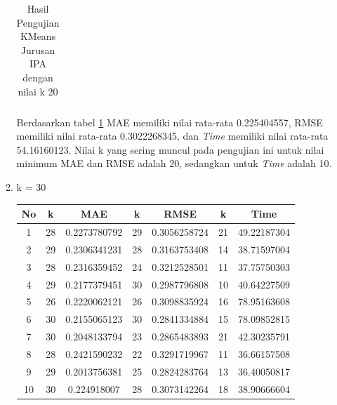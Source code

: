 \begin{enumerate}
\begin{enumerate}
\begin{longtable}[H]{|c|c|c|c|c|c|c|}
                        \caption{Hasil Pengujian KMeans Jurusan IPA dengan nilai k 20}
                        \label{tab:ipa k = 20}
                    \end{longtable}
                \endgroup
                
                Berdasarkan tabel \ref{tab:ipa k = 20} MAE memiliki nilai rata-rata 0.225404557, RMSE memiliki nilai rata-rata 0.3022268345, dan \textit{Time} memiliki nilai rata-rata 54.16160123. Nilai k yang sering muncul pada pengujian ini untuk nilai minimum MAE dan RMSE adalah 20, sedangkan untuk \textit{Time} adalah 10.
                
            \item k = 30 \\
                \begingroup
                \renewcommand\arraystretch{1.5}
                    \begin{longtable}[H]{|c|c|c|c|c|c|c|}
                        \hline
                        No & k & MAE & k & RMSE & k & Time \\
                        \hline
                        1 & 28 & 0.2273780792 & 29 & 0.3056258724 & 21 & 49.22187304\\
                        \hline
                        2 & 29 & 0.2306341231 & 28 & 0.3163753408 & 14 & 38.71597004\\
                        \hline
                        3 & 28 & 0.2316359452 & 24 & 0.3212528501 & 11 & 37.75750303\\
                        \hline
                        4 & 29 & 0.2177379451 & 30 & 0.2987796808 & 10 & 40.64227509\\
                        \hline
                        5 & 26 & 0.2220062121 & 26 & 0.3098835924 & 16 & 78.95163608\\
                        \hline
                        6 & 30 & 0.2155065123 & 30 & 0.2841334884 & 15 & 78.09852815\\
                        \hline
                        7 & 30 & 0.2048133794 & 23 & 0.2865483893 & 21 & 42.30235791\\
                        \hline
                        8 & 28 & 0.2421590232 & 22 & 0.3291719967 & 11 & 36.66157508\\
                        \hline
                        9 & 29 & 0.2013756381 & 25 & 0.2824283764 & 13 & 36.40050817\\
                        \hline
                        10 & 30 & 0.224918007 & 28 & 0.3073142264 & 18 & 38.90666604\\
                        \hline
                        

\end{longtable}
\end{enumerate}
\end{enumerate}
